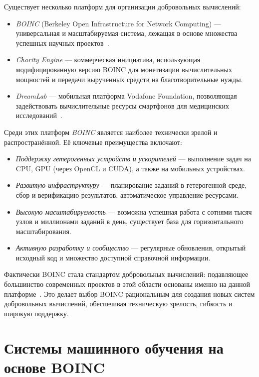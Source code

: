 \documentclass[a4paper,12pt]{extarticle}
\begin{document}
Существует несколько платформ для организации добровольных вычислений:
\begin{itemize}
    \item \textit{BOINC} (Berkeley Open Infrastructure for Network Computing) — универсальная и масштабируемая система, лежащая в основе множества успешных научных проектов~\cite{anderson2020boinc}.
    \item \textit{Charity Engine} — коммерческая инициатива, использующая модифицированную версию BOINC для монетизации вычислительных мощностей и передачи вырученных средств на благотворительные нужды.
    \item \textit{DreamLab} — мобильная платформа Vodafone Foundation, позволяющая задействовать вычислительные ресурсы смартфонов для медицинских исследований~\cite{Tapparello2015}.
\end{itemize}

Среди этих платформ \textit{BOINC} является наиболее технически зрелой и распространённой.
Её ключевые преимущества включают:

\begin{itemize}
    \item \textit{Поддержку гетерогенных устройств и ускорителей} — выполнение задач на CPU, GPU (через OpenCL и CUDA), а также на мобильных устройствах.
    \item \textit{Развитую инфраструктуру} — планирование заданий в гетерогенной среде, сбор и верификацию результатов, автоматическое управление ресурсами.
    \item \textit{Высокую масштабируемость} — возможна успешная работа с сотнями тысяч узлов и миллионами заданий в день, существует база для горизонтального масштабирования.
    \item \textit{Активную разработку и сообщество} — регулярные обновления, открытый исходный код и множество доступной справочной информации.
\end{itemize}

Фактически BOINC стала стандартом добровольных вычислений: подавляющее большинство современных проектов в этой области основаны именно на данной платформе~\cite{Mengistu2019}.
Это делает выбор BOINC рациональным для создания новых систем добровольных вычислений, обеспечивая техническую зрелость, гибкость и широкую поддержку.

\section{Системы машинного обучения на основе BOINC}
\end{document}
